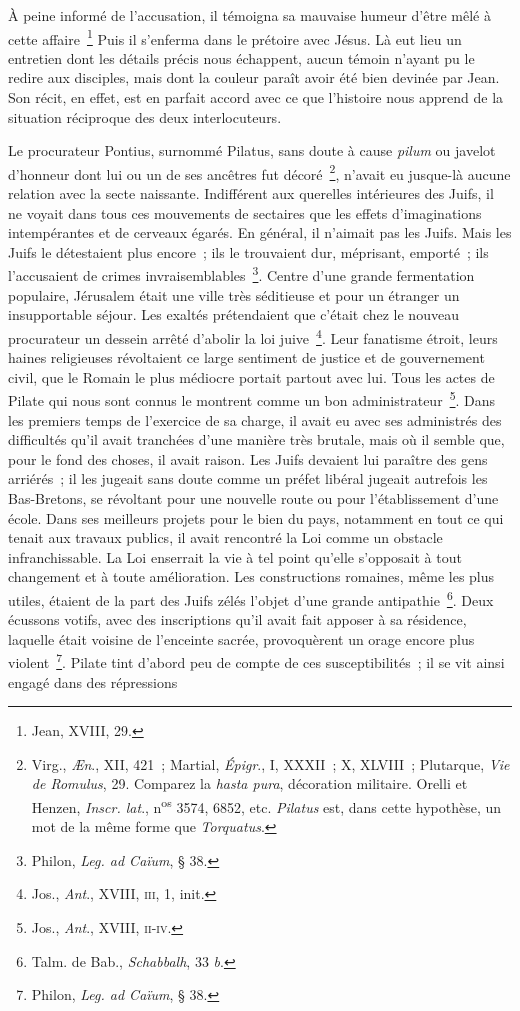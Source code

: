\documentclass[french,twoside]{book} %
\begin{document}
À peine informé de l’accusation, il témoigna sa mauvaise humeur d’être mêlé à cette affaire \footnote{Jean, XVIII, 29.} Puis il s’enferma dans le prétoire avec Jésus. Là eut lieu un entretien dont les détails précis nous échappent, aucun témoin n’ayant pu le redire aux disciples, mais dont la couleur paraît avoir été bien devinée par Jean. Son récit, en effet, est en parfait accord avec ce que l’histoire nous apprend de la situation réciproque des deux interlocuteurs.\par
Le procurateur Pontius, surnommé Pilatus, sans doute à cause {\itshape pilum} ou javelot d’honneur dont lui ou un de ses ancêtres fut décoré \footnote{ Virg., {\itshape Æn}., XII, 421 ; Martial, {\itshape Épigr}., I, XXXII ; X, XLVIII ; Plutarque, {\itshape Vie de Romulus}, 29. Comparez la {\itshape hasta pura}, décoration militaire. Orelli et Henzen, {\itshape Inscr. lat}., n\textsuperscript{os} 3574, 6852, etc. {\itshape Pilatus} est, dans cette hypothèse, un mot de la même forme que {\itshape Torquatus}.}, n’avait eu jusque-là aucune relation avec la secte naissante. Indifférent aux querelles intérieures des Juifs, il ne voyait dans tous ces mouvements de sectaires que les effets d’imaginations intempérantes et de cerveaux égarés. En général, il n’aimait pas les Juifs. Mais les Juifs le détestaient plus encore ; ils le trouvaient dur, méprisant, emporté ; ils l’accusaient de crimes invraisemblables \footnote{ Philon, {\itshape Leg. ad Caïum}, § 38.}. Centre d’une grande fermentation populaire, Jérusalem était une ville très séditieuse et pour un étranger un insupportable séjour. Les exaltés prétendaient que c’était chez le nouveau procurateur un dessein arrêté d’abolir la loi juive \footnote{ Jos., {\itshape Ant}., XVIII, \textsc{iii}, 1, init.}. Leur fanatisme étroit, leurs haines religieuses révoltaient ce large sentiment de justice et de gouvernement civil, que le Romain le plus médiocre portait partout avec lui. Tous les actes de Pilate qui nous sont connus le montrent comme un bon administrateur \footnote{ Jos., {\itshape Ant}., XVIII, \textsc{ii-iv}.}. Dans les premiers temps de l’exercice de sa charge, il avait eu avec ses administrés des difficultés qu’il avait tranchées d’une manière très brutale, mais où il semble que, pour le fond des choses, il avait raison. Les Juifs devaient lui paraître des gens arriérés ; il les jugeait sans doute comme un préfet libéral jugeait autrefois les Bas-Bretons, se révoltant pour une nouvelle route ou pour l’établissement d’une école. Dans ses meilleurs projets pour le bien du pays, notamment en tout ce qui tenait aux travaux publics, il avait rencontré la Loi comme un obstacle infranchissable. La Loi enserrait la vie à tel point qu’elle s’opposait à tout changement et à toute amélioration. Les constructions romaines, même les plus utiles, étaient de la part des Juifs zélés l’objet d’une grande antipathie \footnote{ Talm. de Bab., {\itshape Schabbalh}, 33 {\itshape b}.}. Deux écussons votifs, avec des inscriptions qu’il avait fait apposer à sa résidence, laquelle était voisine de l’enceinte sacrée, provoquèrent un orage encore plus violent \footnote{ Philon, {\itshape Leg. ad Caïum}, § 38.}. Pilate tint d’abord peu de compte de ces susceptibilités ; il se vit ainsi engagé dans des répressions 
\end{document}
